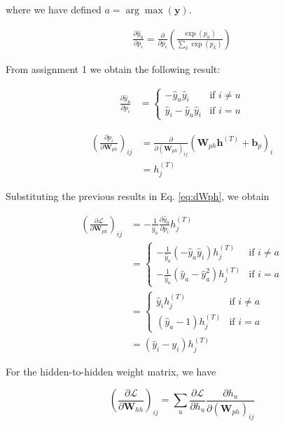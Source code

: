\documentclass{article}
\newcommand{\pd}[2]{\frac{\partial #1}{\partial #2}}
\begin{document}
where we have defined $a = \arg\max(\mathbf{y})$.

\begin{align*}
\pd{\hat{y}_u}{p_i} = \pd{}{p_i}\left(\frac{\exp(p_u)}{\sum_k\exp(p_k)}  \right)
\end{align*}

From assignment 1 we obtain the following result:

\begin{align*}
\pd{\hat{y}_u}{p_i} &=
\left\lbrace
\begin{matrix}
-\hat{y}_u\hat{y}_i & \text{if } i \neq u \\
\hat{y}_i -\hat{y}_u\hat{y}_i & \text{if } i = u
\end{matrix}
\right.
\end{align*}

\begin{align*}
\left(\pd{p_i}{\mathbf{W}_{ph}} \right)_{ij} &= \pd{}{(\mathbf{W}_{ph})_{ij}}(\mathbf{W}_{ph}\mathbf{h}^{(T)} + \mathbf{b}_p)_i \\
&= h^{(T)}_j
\end{align*}

Substituting the previous results in Eq. \ref{eq:dWph}, we obtain

\begin{align*}
\left(\pd{\mathcal{L}}{\mathbf{W}_{ph}}\right)_{ij} &= -\frac{1}{\hat{y}_a} \pd{\hat{y}_a}{p_i}h_j^{(T)} \\
&=
\left\lbrace
\begin{matrix}
-\frac{1}{\hat{y}_a}(-\hat{y}_a\hat{y}_i)h_j^{(T)} & \text{if } i \neq a \\
-\frac{1}{\hat{y}_a}(\hat{y}_a -\hat{y}_a^2)h_j^{(T)} & \text{if } i = a
\end{matrix}
\right.\\
&=
\left\lbrace
\begin{matrix}
\hat{y}_i h_j^{(T)} & \text{if } i \neq a \\
(\hat{y}_a - 1)h_j^{(T)} & \text{if } i = a
\end{matrix}
\right.\\
&= (\hat{y}_i - y_i)h_j^{(T)}
\end{align*}

For the hidden-to-hidden weight matrix, we have

\begin{equation}
\left(\pd{\mathcal{L}}{\mathbf{W}_{hh}}\right)_{ij} = \sum_u\pd{\mathcal{L}}{h_u}\pd{h_u}{(\mathbf{W}_{ph})_{ij}}
\label{eq:dWhh}
\end{equation}
\end{document}
